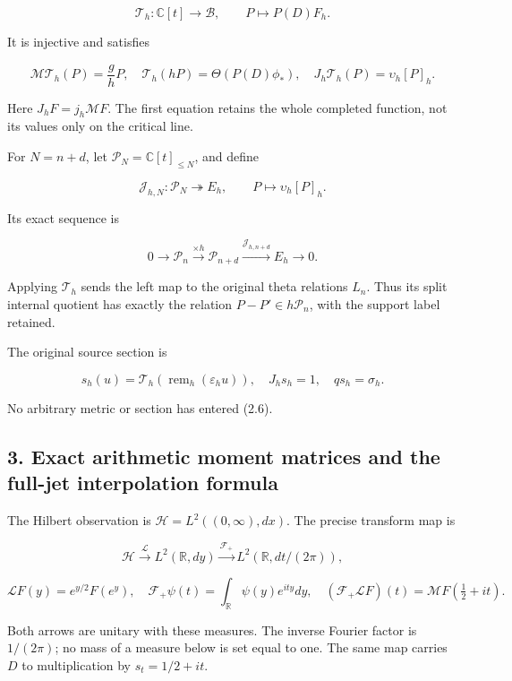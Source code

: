 \documentclass[
]{article}
\begin{document}
\[\boxed{\mathcal T_h:\mathbb C[t]\longrightarrow\mathscr B,\qquad P\longmapsto P(D)F_h.}\tag{2.4}\]

It is injective and satisfies

\[\mathcal M\mathcal T_h(P)=\frac gh P,\quad
\mathcal T_h(hP)=\Theta(P(D)\phi_*),\quad
J_h\mathcal T_h(P)=\upsilon_h[P]_h.\tag{2.5}\]

Here \(J_hF=j_h\mathcal MF\). The first equation retains the whole
completed function, not its values only on the critical line.

For \(N=n+d\), let \(\mathcal P_N=\mathbb C[t]_{\le N}\), and define

\[\mathcal J_{h,N}:\mathcal P_N\twoheadrightarrow E_h,\qquad P\longmapsto\upsilon_h[P]_h.\]

Its exact sequence is

\[\boxed{0\longrightarrow\mathcal P_n\xrightarrow{\times h}\mathcal P_{n+d}
\xrightarrow{\mathcal J_{h,n+d}}E_h\longrightarrow0.}\tag{2.6}\]

Applying \(\mathcal T_h\) sends the left map to the original theta
relations \(L_n\). Thus its split internal quotient has exactly the
relation \(P-P'\in h\mathcal P_n\), with the support label retained.

The original source section is

\[s_h(u)=\mathcal T_h(\operatorname{rem}_h(\varepsilon_hu)),\quad J_hs_h=1,\quad qs_h=\sigma_h.\tag{2.7}\]

No arbitrary metric or section has entered (2.6).

\subsection{3. Exact arithmetic moment matrices and the full-jet
interpolation
formula}\label{exact-arithmetic-moment-matrices-and-the-full-jet-interpolation-formula}

The Hilbert observation is \(\mathcal H=L^2((0,\infty),dx)\). The
precise transform map is

\[\mathcal H\xrightarrow{\mathcal L}L^2(\mathbb R,dy)
\xrightarrow{\mathcal F_+}L^2(\mathbb R,dt/(2\pi)),\]

\[\mathcal LF(y)=e^{y/2}F(e^y),\quad
\mathcal F_+\psi(t)=\int_{\mathbb R}\psi(y)e^{ity}dy,\quad
(\mathcal F_+\mathcal LF)(t)=\mathcal MF(\tfrac12+it).\tag{3.1}\]

Both arrows are unitary with these measures. The inverse Fourier factor
is \(1/(2\pi)\); no mass of a measure below is set equal to one. The
same map carries \(D\) to multiplication by \(s_t=1/2+it\).
\end{document}
